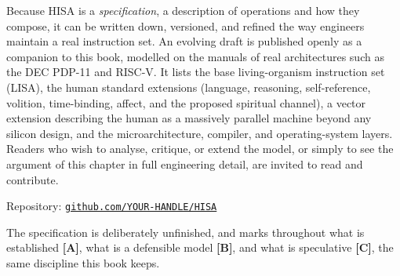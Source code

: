 \begin{keybox}
Because HISA is a \emph{specification}, a description of operations and how they compose,
it can be written down, versioned, and refined the way engineers maintain a real
instruction set. An evolving draft is published openly as a companion to this book,
modelled on the manuals of real architectures such as the DEC PDP-11 and RISC-V. It lists
the base living-organism instruction set (LISA), the human standard extensions (language,
reasoning, self-reference, volition, time-binding, affect, and the proposed spiritual
channel), a vector extension describing the human as a massively parallel machine beyond
any silicon design, and the microarchitecture, compiler, and operating-system layers.
Readers who wish to analyse, critique, or extend the model, or simply to see the argument
of this chapter in full engineering detail, are invited to read and contribute.

\medskip
\noindent Repository: \href{https://github.com/YOUR-HANDLE/HISA}{\texttt{github.com/YOUR-HANDLE/HISA}}

\medskip
\noindent The specification is deliberately unfinished, and marks throughout what is
established \textbf{[A]}, what is a defensible model \textbf{[B]}, and what is speculative
\textbf{[C]}, the same discipline this book keeps.
\end{keybox}
